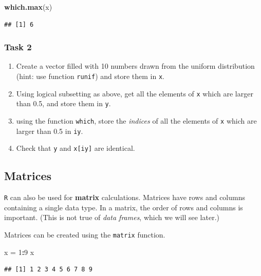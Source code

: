 \documentclass[]{book}
\newenvironment{Shaded}{\begin{snugshade}}{\end{snugshade}}
\newcommand{\KeywordTok}[1]{\textcolor[rgb]{0.13,0.29,0.53}{\textbf{#1}}}
\newcommand{\DecValTok}[1]{\textcolor[rgb]{0.00,0.00,0.81}{#1}}
\newcommand{\StringTok}[1]{\textcolor[rgb]{0.31,0.60,0.02}{#1}}
\newcommand{\OperatorTok}[1]{\textcolor[rgb]{0.81,0.36,0.00}{\textbf{#1}}}
\newcommand{\NormalTok}[1]{#1}
\providecommand{\tightlist}{%
  \setlength{\itemsep}{0pt}\setlength{\parskip}{0pt}}
\theoremstyle{definition}
\theoremstyle{definition}
\theoremstyle{definition}
\theoremstyle{remark}
\begin{document}
\begin{Shaded}
\begin{Highlighting}[]
\KeywordTok{which.max}\NormalTok{(x)}
\end{Highlighting}
\end{Shaded}

\begin{verbatim}
## [1] 6
\end{verbatim}

\subsubsection{Task 2}\label{task-2}

\begin{enumerate}
\def\labelenumi{\arabic{enumi}.}
\tightlist
\item
  Create a vector filled with 10 numbers drawn from the uniform
  distribution (hint: use function \texttt{runif}) and store them in
  \texttt{x}.
\item
  Using logical subsetting as above, get all the elements of \texttt{x}
  which are larger than 0.5, and store them in \texttt{y}.
\item
  using the function \texttt{which}, store the \emph{indices} of all the
  elements of \texttt{x} which are larger than 0.5 in \texttt{iy}.
\item
  Check that \texttt{y} and \texttt{x{[}iy{]}} are identical.
\end{enumerate}

\subsection{Matrices}\label{matrices}

\texttt{R} can also be used for \textbf{matrix} calculations. Matrices
have rows and columns containing a single data type. In a matrix, the
order of rows and columns is important. (This is not true of \emph{data
frames}, which we will see later.)

Matrices can be created using the \texttt{matrix} function.

\begin{Shaded}
\begin{Highlighting}[]
\NormalTok{x =}\StringTok{ }\DecValTok{1}\OperatorTok{:}\DecValTok{9}
\NormalTok{x}
\end{Highlighting}
\end{Shaded}

\begin{verbatim}
## [1] 1 2 3 4 5 6 7 8 9
\end{verbatim}
\end{document}

